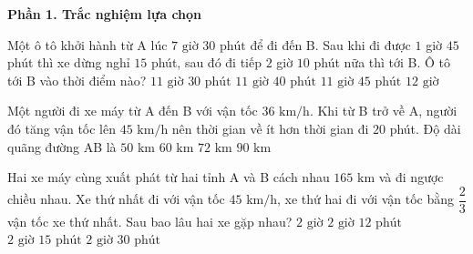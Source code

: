 \textbf{Phần 1. Trắc nghiệm lựa chọn}

\begin{ex} %
Một ô tô khởi hành từ A lúc $7\text{ giờ } 30\text{ phút}$ để đi đến B. Sau khi đi được $1$ giờ $45$ phút thì xe dừng nghỉ $15$ phút, sau đó đi tiếp $2$ giờ $10$ phút nữa thì tới B. Ô tô tới B vào thời điểm nào?
\choice
{$11\text{ giờ } 30\text{ phút}$}
{\True $11\text{ giờ } 40\text{ phút}$}
{$11\text{ giờ } 45\text{ phút}$}
{$12\text{ giờ}$}
\end{ex}

\begin{ex} %
Một người đi xe máy từ A đến B với vận tốc $36\text{ km/h}$. Khi từ B trở về A, người đó tăng vận tốc lên $45\text{ km/h}$ nên thời gian về ít hơn thời gian đi $20$ phút. Độ dài quãng đường AB là
\choice
{$50\text{ km}$}
{\True $60\text{ km}$}
{$72\text{ km}$}
{$90\text{ km}$}
\end{ex}

\begin{ex} %
Hai xe máy cùng xuất phát từ hai tỉnh A và B cách nhau $165\text{ km}$ và đi ngược chiều nhau. Xe thứ nhất đi với vận tốc $45\text{ km/h}$, xe thứ hai đi với vận tốc bằng $\dfrac{2}{3}$ vận tốc xe thứ nhất. Sau bao lâu hai xe gặp nhau?
\choice
{$2\text{ giờ}$}
{\True $2\text{ giờ } 12\text{ phút}$}
{$2\text{ giờ } 15\text{ phút}$}
{$2\text{ giờ } 30\text{ phút}$}
\end{ex}

